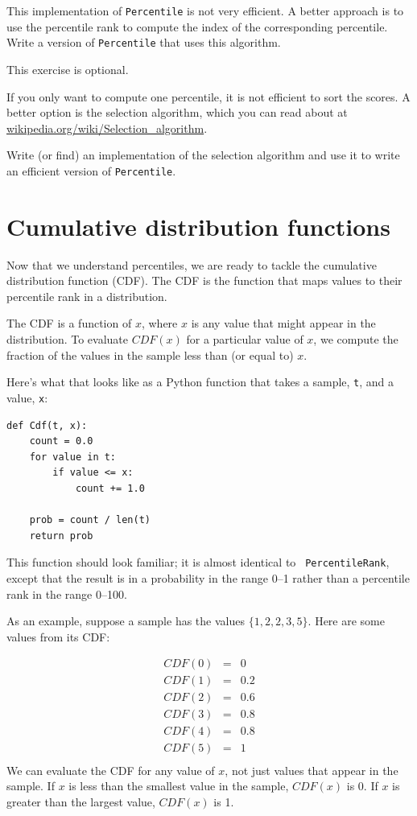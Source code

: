 \documentclass[12pt]{book}
\begin{document}
\begin{ex}
This implementation of {\tt Percentile} is not very efficient.  A
better approach is to use the percentile rank to compute the index of
the corresponding percentile.  Write a version of {\tt Percentile} that
uses this algorithm.
\end{ex}

\begin{ex}
This exercise is optional.

If you only want to compute one percentile, it is not efficient
to sort the scores.  A better option is the selection algorithm,
which you can read about at \url{wikipedia.org/wiki/Selection_algorithm}.

Write (or find) an implementation of the selection algorithm and use
it to write an efficient version of {\tt Percentile}.
\end{ex}


\section{Cumulative distribution functions}

Now that we understand percentiles, we are ready to tackle the
cumulative distribution function (CDF).  The CDF is the function that
maps values to their percentile rank in a distribution.

The CDF is a function of $x$, where $x$ is any value that might appear
in the distribution.  To evaluate $CDF(x)$ for a particular value of
$x$, we compute the fraction of the values in the sample less than (or
equal to) $x$.

Here's what that looks like as a Python function that takes a sample,
{\tt t}, and a value, {\tt x}:

\begin{verbatim}
def Cdf(t, x):
    count = 0.0
    for value in t:
        if value <= x:
            count += 1.0

    prob = count / len(t)
    return prob
\end{verbatim}

This function should look familiar; it is almost identical to {\tt
  PercentileRank}, except that the result is in a probability in the
range 0--1 rather than a percentile rank in the range 0--100.

As an example, suppose a sample has the values $\{1, 2, 2, 3, 5\}$.
Here are some values from its CDF:

\begin{eqnarray*}
CDF(0) &=& 0    \\
CDF(1) &=& 0.2    \\
CDF(2) &=& 0.6    \\
CDF(3) &=& 0.8    \\
CDF(4) &=& 0.8    \\
CDF(5) &=& 1    \\
\end{eqnarray*}
%
We can evaluate the CDF for any value of $x$, not just
values that appear in the sample.
If $x$ is less than the smallest value in the sample, $CDF(x)$ is 0.
If $x$ is greater than the largest value, $CDF(x)$ is 1.
\end{document}
